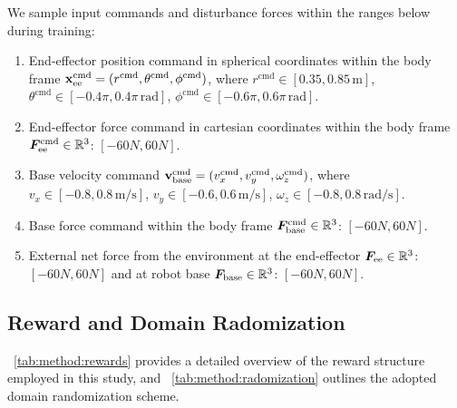 \documentclass{article}
\begin{document}
We sample input commands and disturbance forces within the ranges below during training:
\begin{enumerate}[leftmargin=*]
\item End-effector position command in spherical coordinates within the body frame
${\mathbf{x}}^{\text{cmd}}_\text{ee} = (r^{\text{cmd}}, \theta^{\text{cmd}}, \phi^{\text{cmd}})$, where 
$r^{\text{cmd}} \in [0.35, 0.85 \, \text{m}]$,
$\theta^{\text{cmd}} \in [-0.4\pi, 0.4\pi \, \text{rad}]$,
$\phi^{\text{cmd}} \in [-0.6\pi, 0.6\pi \, \text{rad}]$.
\item End-effector force command in cartesian coordinates within the body frame
\({\bm{F}}^{\text{cmd}}_{\text{ee}}\in \mathbb{R}^3\):
$[-60N, 60N]$.
\item Base velocity command ${\mathbf{v}}^{\text{cmd}}_{\text{base}} = (v^{\text{cmd}}_x, v^{\text{cmd}}_y, \omega^{\text{cmd}}_z)$, where 
$v_x \in [-0.8, 0.8 \, \text{m/s}]$,
$v_y \in [-0.6, 0.6 \, \text{m/s}]$,
$\omega_z \in [-0.8, 0.8 \, \text{rad/s}]$.
\item Base force command within the body frame
\({\bm{F}}^{\text{cmd}}_{\text{base}}\in \mathbb{R}^3\):
$[-60N, 60N]$.
\item External net force from the environment at the end-effector 
\({\bm{F}}_{\text{ee}}\in \mathbb{R}^3\): $[-60N, 60N]$ and at robot base \({\bm{F}}_{\text{base}}\in \mathbb{R}^3\): $[-60N, 60N]$.
\end{enumerate}

\subsection{Reward and Domain Radomization}

~\cref{tab:method:rewards} provides a detailed overview of the reward structure employed in this study, and ~\cref{tab:method:radomization} outlines the adopted domain randomization scheme.
\end{document}
